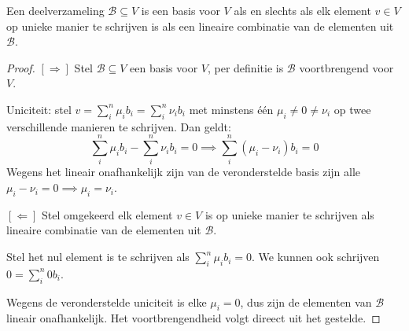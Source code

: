 \begin{stelling}[2.4.4]
    Een deelverzameling $\mathcal{B} \subseteq V$ is een basis voor $V$ als en slechts als elk element $v \in V$ op unieke manier te schrijven is als een lineaire combinatie van de elementen uit $\mathcal{B}$.
\end{stelling}
\begin{proof}
    \([\Rightarrow]\) Stel $\mathcal{B} \subseteq V$ een basis voor $V$, per definitie is \(\mathcal{B} \) voortbrengend voor \(V\).
    
    Uniciteit: stel \(v = \sum_{i}^{n} \mu_i b_i = \sum_{i}^{n} \nu_i b_i\) met minstens één \( \mu_i \neq 0 \neq \nu_i\) op twee verschillende manieren te schrijven.
    Dan geldt:
    \[
        \sum_{i}^{n} \mu_i b_i - \sum_{i}^{n} \nu_i b_i = 0
        \implies \sum_{i}^{n} (\mu_i-\nu_i)b_i = 0
    \]
    Wegens het lineair onafhankelijk zijn van de veronderstelde basis zijn alle \(\mu_i - \nu_i = 0 \implies \mu_i = \nu_i\).

    \([\Leftarrow]\) Stel omgekeerd elk element $v \in V$ is op unieke manier te schrijven als lineaire combinatie van de elementen uit $\mathcal{B}$.

    Stel het nul element is te schrijven als \(\sum_i^n \mu_i b_i = 0 \).
    We kunnen ook schrijven \(0 = \sum_i^n 0 b_i \).

    Wegens de veronderstelde uniciteit is elke \(\mu_i = 0\), dus zijn de elementen van \(\mathcal{B}\) lineair onafhankelijk.
    Het voortbrengendheid volgt direect uit het gestelde.
\end{proof}

